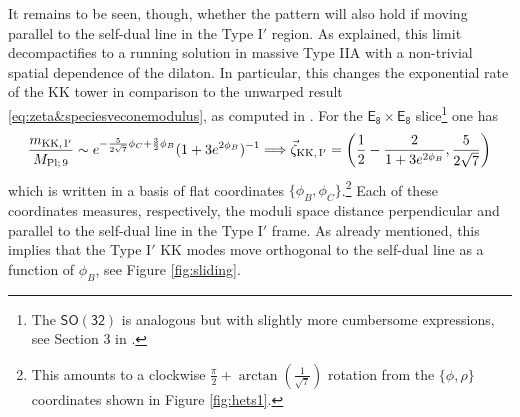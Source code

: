 It remains to be seen, though, whether the pattern will also hold if moving parallel to the self-dual line in the Type I$'$ region. As explained, this limit decompactifies to a running solution in massive Type IIA with a non-trivial spatial dependence of the dilaton. In particular, this changes the exponential rate of the KK tower in comparison to the unwarped result \eqref{eq:zeta&speciesveconemodulus}, as computed in \cite{Etheredge:2023odp}.  For the $\mathsf{E_8\times E_8}$ slice\footnote{The $\mathsf{SO(32)}$ is analogous but with slightly more cumbersome expressions, see Section 3 in \cite{Etheredge:2023odp}.} one has
\begin{equation}\label{eq: sliding}
	\frac{m_{\rm KK,\, I'}}{M_{\rm Pl;\, 9}}\sim e^{-\frac{5}{2\sqrt{7}}\phi_C+\frac{3}{2}\phi_B}(1+3e^{2\phi_B})^{-1}\Longrightarrow \vec{\zeta}_{\rm KK,\, I'}=\left(\frac{1}{2}-\frac{2}{1+3e^{2\phi_B}},\frac{5}{2\sqrt{7}}\right)
\end{equation}
which is written in a basis of flat coordinates $\{\phi_B,\phi_C\}$.\footnote{This amounts to a clockwise $\frac{\pi }{2}+\arctan\left(\frac{1}{\sqrt{7}}\right)$ rotation from the $\{\phi,\rho\}$ coordinates shown in Figure \ref{fig:hets1}.} Each of these coordinates measures, respectively, the moduli space distance perpendicular and parallel to the self-dual line in the Type I$'$ frame. As already mentioned, this implies that the Type I$'$ KK modes move orthogonal to the self-dual line as a function of $\phi_B$, see Figure \ref{fig:sliding}.
